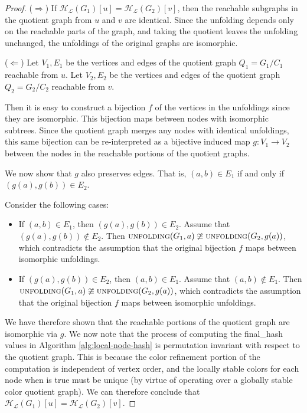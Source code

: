 \documentclass[twoside,leqno]{article}
\begin{document}
\begin{proof}
  ($\Rightarrow$) If $\mathcal{H_L}(G_1)[u] = \mathcal{H_L}(G_2)[v]$, then the reachable subgraphs in the quotient graph from $u$ and $v$ are identical. Since the unfolding depends only on the reachable parts of the graph, and taking the quotient leaves the unfolding unchanged, the unfoldings of the original graphs are isomorphic.

  ($\Leftarrow$) Let $V_1, E_1$ be the vertices and edges of the quotient graph $Q_1 = G_1 / C_1$ reachable from $u$. Let $V_2, E_2$ be the vertices and edges of the quotient graph $Q_2 = G_2 / C_2$ reachable from $v$.
  
  Then it is easy to construct a bijection $f$ of the vertices in the unfoldings since they are isomorphic. This bijection maps between nodes with isomorphic subtrees. Since the quotient graph merges any nodes with identical unfoldings, this same bijection can be re-interpreted as a bijective induced map $g : V_1 \rightarrow V_2$ between the nodes in the reachable portions of the quotient graphs.

  We now show that $g$ also preserves edges. That is, $(a, b) \in E_1$ if and only if $(g(a), g(b)) \in E_2$.
  
  Consider the following cases:
  \begin{itemize}
    \item If $(a, b) \in E_1$, then $(g(a), g(b)) \in E_2$. Assume that $(g(a), g(b)) \notin E_2$. Then $\textproc{unfolding}(G_1, a) \ncong  \textproc{unfolding}(G_2, g(a))$, which contradicts the assumption that the original bijection $f$ maps between isomorphic unfoldings.
    \item If $(g(a), g(b)) \in E_2$, then $(a, b) \in E_1$. Assume that $(a, b) \notin E_1$. Then $\textproc{unfolding}(G_1, a) \ncong  \textproc{unfolding}(G_2, g(a))$, which contradicts the assumption that the original bijection $f$ maps between isomorphic unfoldings.
  \end{itemize}

  We have therefore shown that the reachable portions of the quotient graph are isomorphic via $g$. We now note that the process of computing the final\_hash values in Algorithm \ref{alg:local-node-hash} is permutation invariant with respect to the quotient graph. This is because the color refinement portion of the computation is independent of vertex order, and the locally stable colors for each node when  is true must be unique (by virtue of operating over a globally stable color quotient graph). We can therefore conclude that $\mathcal{H_L}(G_1)[u] = \mathcal{H_L}(G_2)[v]$. 
\end{proof}
\end{document}
